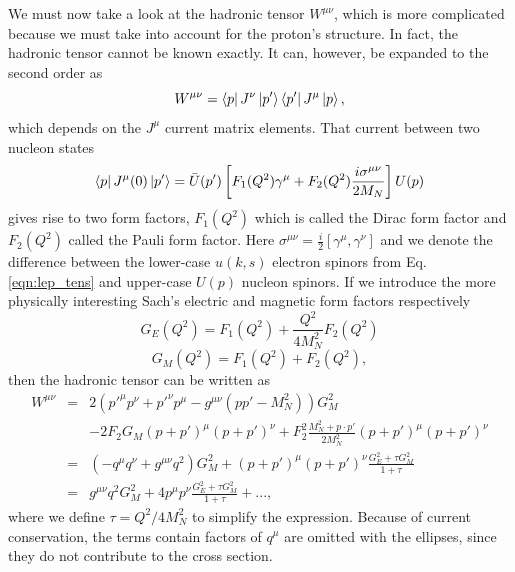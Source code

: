 We must now take a look at the hadronic tensor $W^{\mu\nu}$, which is more complicated because we must take into account for the proton's structure. In fact, the hadronic tensor cannot be known exactly. It can, however, be expanded to the second order as
\begin{equation}
W^{\mu\nu} = \bra{p}J^{\nu}\ket{p'}\bra{p'}J^{\mu}\ket{p},
\end{equation}
which depends on the $J^{\mu}$ current matrix elements. That current between two nucleon states
\begin{equation}
\bra{p}J^{\mu}(0)\ket{p'} = \bar{U}(p')\left[ F_1(Q^2)\gamma^{\mu}+F_2(Q^2)\frac{i\sigma^{\mu\nu}}{2M_N} \right]U(p)
\end{equation}
gives rise to two form factors, $F_1(Q^2)$ which is called the Dirac form factor and $F_2(Q^2)$ called the Pauli form factor. Here $\sigma^{\mu\nu}=\tfrac{i}{2}[\gamma^{\mu},\gamma^{\nu}]$ and we denote the difference between the lower-case $u(k,s)$ electron spinors from Eq. \ref{eqn:lep_tens} and upper-case $U(p)$ nucleon spinors. If we introduce the more physically interesting Sach's electric and magnetic form factors respectively
\begin{equation}
\nonumber
G_E(Q^2) = F_1(Q^2) + \frac{Q^2}{4M_N^2} F_2(Q^2)
\end{equation}
\begin{equation}
\nonumber
G_M(Q^2) = F_1(Q^2) + F_2(Q^2),
\end{equation}
then the hadronic tensor can be written as
\begin{eqnarray}
\nonumber
W^{\mu\nu} &=& 2(p'^{\mu}p^{\nu} + p'^{\nu}p^{\mu} - g^{\mu\nu}(pp'-M_N^2))G_M^2 \\
\nonumber
&&- 2F_2G_M(p+p')^{\mu}(p+p')^{\nu}+F_2^2\frac{M_N^2+p \cdot p'}{2M_N^2}(p+p')^{\mu}(p+p')^{\nu} \\
\nonumber
&=& (-q^{\mu}q^{\nu}+g^{\mu\nu}q^2)G_M^2+(p+p')^{\mu}(p+p')^{\nu}\frac{G_E^2+\tau G_M^2}{1+\tau} \\
&=& g^{\mu\nu}q^2G_M^2+4p^{\mu}p^{\nu}\frac{G_E^2+\tau G_M^2}{1+\tau} + ...,
\end{eqnarray} 
where we define $\tau = Q^2/4M_N^2$ to simplify the expression. Because of current conservation, the terms contain factors of $q^{\mu}$ are omitted with the ellipses, since they do not contribute to the cross section.

